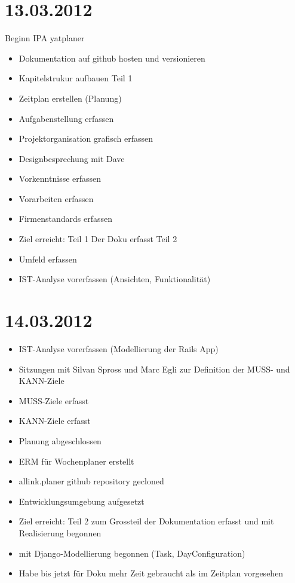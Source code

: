 \section{13.03.2012}
Beginn IPA yatplaner
\begin{itemize}
    \item Dokumentation auf github hosten und versionieren
    \item Kapitelstrukur aufbauen 
    Teil 1\\
    \item Zeitplan erstellen (Planung)
    \item Aufgabenstellung erfassen
    \item Projektorganisation grafisch erfassen
    \item Designbesprechung mit Dave
    \item Vorkenntnisse erfassen
    \item Vorarbeiten erfassen
    \item Firmenstandards erfassen
    \item Ziel erreicht: Teil 1 Der Doku erfasst
    Teil 2\\
    \item Umfeld erfassen
    \item IST-Analyse vorerfassen (Ansichten, Funktionalität)
\end{itemize}
\section{14.03.2012}
\begin{itemize}
    \item IST-Analyse vorerfassen (Modellierung der Rails App)
    \item Sitzungen mit Silvan Spross und Marc Egli zur Definition der MUSS- und KANN-Ziele
    \item MUSS-Ziele erfasst
    \item KANN-Ziele erfasst
    \item Planung abgeschlossen
    \item ERM für Wochenplaner erstellt
    \item allink.planer github repository gecloned
    \item Entwicklungsumgebung aufgesetzt
    \item Ziel erreicht: Teil 2 zum Grossteil der Dokumentation erfasst und mit Realisierung begonnen
    \item mit Django-Modellierung begonnen (Task, DayConfiguration)
    \item Habe bis jetzt für Doku mehr Zeit gebraucht als im Zeitplan vorgesehen
\end{itemize}
